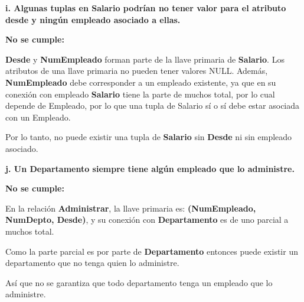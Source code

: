 \vspace{0.5em}

\noindent\textbf{i. Algunas tuplas en Salario podrían no tener valor para
el atributo desde y ningún empleado asociado a ellas.}

\noindent\textbf{No se cumple:}

\textbf{Desde} y \textbf{NumEmpleado} forman parte de la llave primaria
de \textbf{Salario}. Los atributos de una llave primaria no pueden tener
valores NULL. Además, \textbf{NumEmpleado} debe corresponder a un
empleado existente, ya que en su conexión con empleado
\textbf{Salario} tiene la parte de muchos total, por lo cual depende de
Empleado, por lo que una tupla de Salario sí o sí debe estar asociada
con un Empleado.

Por lo tanto, no puede existir una tupla de \textbf{Salario} sin
\textbf{Desde} ni sin empleado asociado.

\vspace{0.5em}

\noindent\textbf{j. Un Departamento siempre tiene algún empleado que lo
administre.}

\noindent\textbf{No se cumple:}

En la relación \textbf{Administrar}, la llave primaria es:
\textbf{(NumEmpleado, NumDepto, Desde)}, y su conexión con
\textbf{Departamento} es de uno parcial a muchos total.

Como la parte parcial es por parte de \textbf{Departamento} entonces
puede existir un departamento que no tenga quien lo administre.

Así que no se garantiza que todo departamento tenga un empleado que
lo administre.
